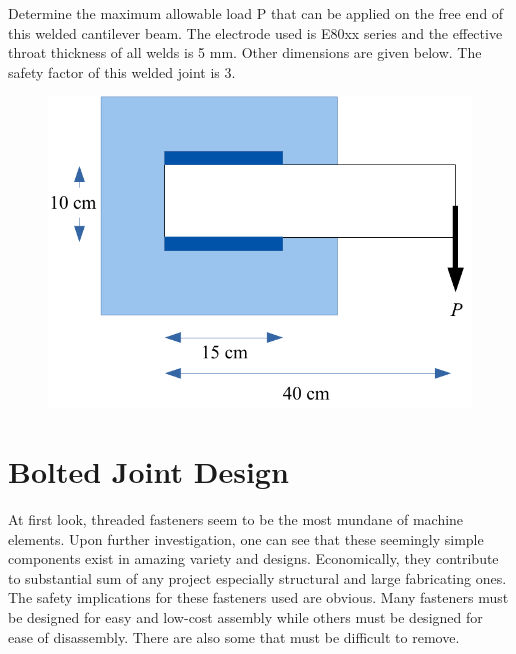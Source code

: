 \documentclass[
10pt,
a4paper,
openany,
svgnames,
]{book}
\newcommand{\exercise}{%
\item \label{lab:\arabic{chapter}-\arabic{exercisesi}}  %
}
\begin{document}
\begin{exercises}
\begin{figure}[H]
  \end{figure}
  \exercise Determine the maximum allowable load P that can be applied on the free end of this welded cantilever beam. The electrode used is E80xx series and the effective throat thickness of all welds is 5 mm. Other dimensions are given below. The safety factor of this welded joint is 3.
  \begin{figure}[H]
    \centering
    \includegraphics[scale=0.72]{pictures/Welding/parallel-weld-exercise}
  \end{figure}
\end{exercises}




\chapter{Bolted Joint Design}

At first look, threaded fasteners seem to be the most mundane of machine elements. Upon further investigation, one can see that these seemingly simple components exist in amazing variety and designs. Economically, they contribute to substantial sum of any project especially structural and large fabricating ones. The safety implications for these fasteners used are obvious. Many fasteners must be designed for easy and low-cost assembly while others must be designed for ease of disassembly. There are also some that must be difficult to remove.
\end{document}
